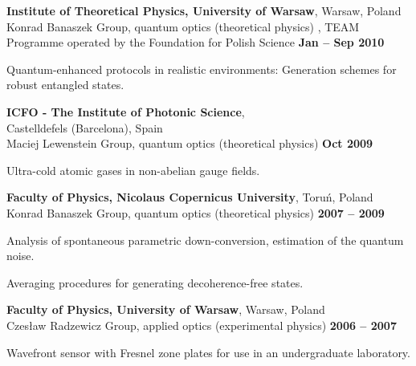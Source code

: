 \documentclass[margin,line]{resume}
\begin{document}
\begin{resume}
	{\bf Institute of Theoretical Physics, University of Warsaw}, Warsaw, Poland\\
	Konrad Banaszek Group, quantum optics (theoretical physics) ,
	TEAM Programme operated by the Foundation for Polish Science \hfill {\bf Jan -- Sep 2010}\\
    \begin{list2}
        \vspace*{-4mm}
        \item Quantum-enhanced protocols in realistic environments: Generation schemes for robust entangled states.
    \end{list2}

    {\bf ICFO - The Institute of Photonic Science},\\ Castelldefels (Barcelona), Spain\\
    Maciej Lewenstein Group, quantum optics (theoretical physics) \hfill {\bf Oct 2009}\\
    \begin{list2}
        \vspace*{-4mm}
        \item Ultra-cold atomic gases in non-abelian gauge fields.
    \end{list2}

    {\bf Faculty of Physics, Nicolaus Copernicus University}, Toruń, Poland\\
    Konrad Banaszek Group, quantum optics (theoretical physics) \hfill {\bf 2007 -- 2009}\\
    \begin{list2}
        \vspace*{-4mm}
        \item Analysis of spontaneous parametric down-conversion, estimation of the quantum noise.
        \item Averaging procedures for generating decoherence-free states.
    \end{list2}

    {\bf Faculty of Physics, University of Warsaw}, Warsaw, Poland\\
    Czesław Radzewicz Group, applied optics (experimental physics) \hfill {\bf 2006 -- 2007}\\
    \begin{list2}
        \vspace*{-4mm}
        \item Wavefront sensor with Fresnel zone plates for use in an undergraduate laboratory.
    \end{list2}


\end{resume}
\end{document}
